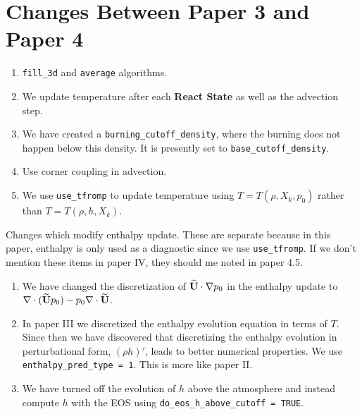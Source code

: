 \section{Changes Between Paper 3 and Paper 4}
\begin{enumerate}
\item {\tt fill\_3d} and {\tt average} algorithms.
\item We update temperature after each {\bf React State} as well as the advection step.
\item We have created a {\tt burning\_cutoff\_density}, where the burning does
not happen below this density.  It is presently set to {\tt base\_cutoff\_density}.
\item Use corner coupling in advection.
\item We use {\tt use\_tfromp} to update temperature using $T=T(\rho,X_k,p_0)$ rather 
than $T=T(\rho,h,X_k)$.
\end{enumerate}
Changes which modify enthalpy update.  These are separate because in this paper,
enthalpy is only used as a diagnostic since we use {\tt use\_tfromp}.  If we don't
mention these items in paper IV, they should me noted in paper 4.5.
\begin{enumerate}
\item We have changed the discretization of $\widetilde{{\bf U}}\cdot\nabla p_0$ in the enthalpy
update to $\nabla\cdot(\widetilde{{\bf U}} p_0) - p_0\nabla\cdot\widetilde{{\bf U}}$.
\item In paper III we discretized the enthalpy evolution equation in
terms of $T$.  Since then we have discovered that 
discretizing the enthalpy evolution in perturbational form, $(\rho h)'$,
leads to better numerical properties.  We use {\tt enthalpy\_pred\_type = 1}.
This is more like paper II.
\item We have turned off the evolution of $h$ above the atmosphere and instead
compute $h$ with the EOS using {\tt do\_eos\_h\_above\_cutoff = TRUE}.
\end{enumerate}
